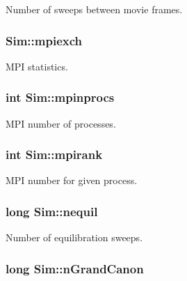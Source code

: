 Number of sweeps between movie frames. 

\hypertarget{class_sim_a791a3f584b47c7a687be95b636a3528c}{
\subsubsection[{mpiexch}]{ Sim\+::mpiexch}}\label{class_sim_a791a3f584b47c7a687be95b636a3528c}


M\+P\+I statistics. 

\hypertarget{class_sim_a94c5eb8fae92f8803d17930fa29e40f2}{
\subsubsection[{mpinprocs}]{\setlength{\rightskip}{0pt plus 5cm}int Sim\+::mpinprocs}}\label{class_sim_a94c5eb8fae92f8803d17930fa29e40f2}


M\+P\+I number of processes. 

\hypertarget{class_sim_ae308bc0b02dea185f040f25b16bbeed1}{
\subsubsection[{mpirank}]{\setlength{\rightskip}{0pt plus 5cm}int Sim\+::mpirank}}\label{class_sim_ae308bc0b02dea185f040f25b16bbeed1}


M\+P\+I number for given process. 

\hypertarget{class_sim_a2bb37396aab56f270fc38442dee52fb1}{
\subsubsection[{nequil}]{\setlength{\rightskip}{0pt plus 5cm}long Sim\+::nequil}}\label{class_sim_a2bb37396aab56f270fc38442dee52fb1}


Number of equilibration sweeps. 

\hypertarget{class_sim_a5590bfd944244ebfe9b72fa43563162e}{
\subsubsection[{n\+Grand\+Canon}]{\setlength{\rightskip}{0pt plus 5cm}long Sim\+::n\+Grand\+Canon}}\label{class_sim_a5590bfd944244ebfe9b72fa43563162e}


